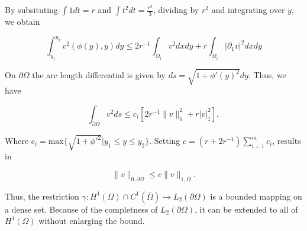 \begin{bev}
    By subsituting $\int 1 dt = r$ and $\int t^2 dt = \frac{r^3}{3}$, dividing by $r^2$ and integrating over $y$, we obtain

    \begin{equation}
        \int_{y_1}^{y_2} v^2(\phi(y), y) dy \leq  2r^{-1} \int_{\Omega_i} v^2 dx dy + r \int_{\Omega_i} | \partial_1 v |^2 dx dy
    \end{equation}

    On $\partial\Omega$ the arc length differential is given by $ds = \sqrt{1 + \phi'{(y)}^2} dy$. Thus, we have

    \begin{equation}
        \int_{\partial\Omega} v^2 ds \leq c_i \left[ 2r^{-1} \| v \|_0^2 + r | v |^2_1 \right],
    \end{equation}

    Where $c_i = \text{max}\{\sqrt{1+{\phi'}^2} | y_1 \leq y \leq y_2 \}$. Setting $c=(r+2r^{-1})\sum_{i=1}^m c_i$, results in

    \begin{equation}
        \| v \|_{0,\partial\Omega} \leq c \| v \|_{1,\Omega}.
    \end{equation}

    Thus, the restriction $\gamma : H^1(\Omega) \cap C^1(\bar{\Omega}) \to L_2(\partial \Omega)$ is a bounded mapping on a dense set. Because of the completness of $L_2(\partial \Omega)$, it can be extended to all of $H^1(\Omega)$ without enlarging the bound.
\end{bev}